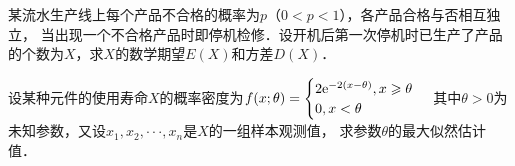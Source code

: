 \documentclass[plain,noanswer,medmath]{../../template/jnuexam}
\begin{document}

\begin{problem}
某流水生产线上每个产品不合格的概率为$p$（$0 < p < 1$），各产品合格与否相互独立，
当出现一个不合格产品时即停机检修．设开机后第一次停机时已生产了产品的个数为$X$，求$X$的数学期望$E(X)$和方差$D(X)$．
\end{problem}



\begin{problem}
设某种元件的使用寿命$X$的概率密度为$f(x;\theta) = \begin{cases}
  2\mathrm{e}^{- 2(x - \theta)},x \geqslant \theta \\
  0, x < \theta
\end{cases}$ 其中$\theta > 0$为未知参数，又设$x_1,x_2, \cdot \cdot \cdot ,x_n$是$X$的一组样本观测值，
求参数$\theta$的最大似然估计值．
\end{problem}
\end{document}
